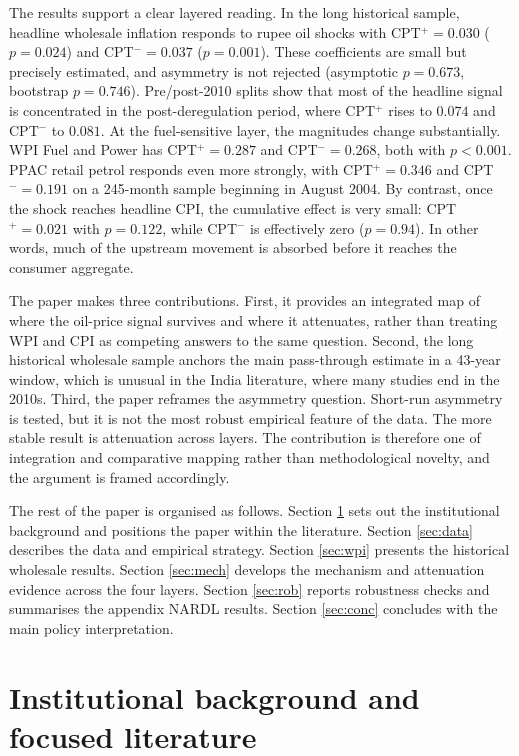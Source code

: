 \documentclass[11pt,a4paper]{article}
\begin{document}
The results support a clear layered reading. In the long historical sample, headline wholesale inflation responds to rupee oil shocks with CPT$^+ = 0.030$ ($p = 0.024$) and CPT$^- = 0.037$ ($p = 0.001$). These coefficients are small but precisely estimated, and asymmetry is not rejected (asymptotic $p = 0.673$, bootstrap $p = 0.746$). Pre/post-2010 splits show that most of the headline signal is concentrated in the post-deregulation period, where CPT$^+$ rises to $0.074$ and CPT$^-$ to $0.081$. At the fuel-sensitive layer, the magnitudes change substantially. WPI Fuel and Power has CPT$^+ = 0.287$ and CPT$^- = 0.268$, both with $p < 0.001$. PPAC retail petrol responds even more strongly, with CPT$^+ = 0.346$ and CPT$^- = 0.191$ on a 245-month sample beginning in August 2004. By contrast, once the shock reaches headline CPI, the cumulative effect is very small: CPT$^+ = 0.021$ with $p = 0.122$, while CPT$^-$ is effectively zero ($p = 0.94$). In other words, much of the upstream movement is absorbed before it reaches the consumer aggregate.

The paper makes three contributions. First, it provides an integrated map of where the oil-price signal survives and where it attenuates, rather than treating WPI and CPI as competing answers to the same question. Second, the long historical wholesale sample anchors the main pass-through estimate in a 43-year window, which is unusual in the India literature, where many studies end in the 2010s. Third, the paper reframes the asymmetry question. Short-run asymmetry is tested, but it is not the most robust empirical feature of the data. The more stable result is attenuation across layers. The contribution is therefore one of integration and comparative mapping rather than methodological novelty, and the argument is framed accordingly.

The rest of the paper is organised as follows. Section \ref{sec:back} sets out the institutional background and positions the paper within the literature. Section \ref{sec:data} describes the data and empirical strategy. Section \ref{sec:wpi} presents the historical wholesale results. Section \ref{sec:mech} develops the mechanism and attenuation evidence across the four layers. Section \ref{sec:rob} reports robustness checks and summarises the appendix NARDL results. Section \ref{sec:conc} concludes with the main policy interpretation.

\section{Institutional background and focused literature}
\label{sec:back}
\end{document}
